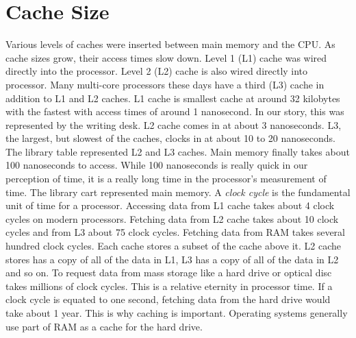\section*{Cache Size}
Various levels of caches were inserted between main memory and the CPU.  
As cache sizes grow, their access times slow down.
Level 1 (L1) cache was wired directly into the processor.  Level 2 (L2) cache is also wired directly into processor.  
Many multi-core processors these days have a third (L3) cache in addition to L1 and L2 caches.  
L1 cache is smallest cache at around 32 kilobytes with the fastest with access times of around 1 nanosecond.
In our story, this was represented by the writing desk.
L2 cache comes in at about 3 nanoseconds.  L3, the largest, but slowest of the caches, clocks in at about 10 to 20 nanoseconds. 
The library table represented L2 and L3 caches.
Main memory finally takes about 100 nanoseconds to access.  While 100 nanoseconds is really quick in our perception of time, it is a really long time in the processor's measurement of time.  
The library cart represented main memory.
A \emph{clock cycle} is the fundamental unit of time for a processor.  
Accessing data from L1 cache takes about 4 clock cycles on modern processors.  Fetching data from L2 cache takes about 10 clock cycles and from L3 about 75 clock cycles.  
Fetching data from RAM takes several hundred clock cycles.
Each cache stores a subset of the cache above it.  L2 cache stores has a copy of all of the data in L1, L3 has a copy of all of the data in L2 and so on.
To request data from mass storage like a hard drive or optical disc takes millions of clock cycles.  This is a relative eternity in processor time.
If a clock cycle is equated to one second, fetching data from the hard drive would take about 1 year.
This is why caching is important.  Operating systems generally use part of RAM as a cache for the hard drive.

